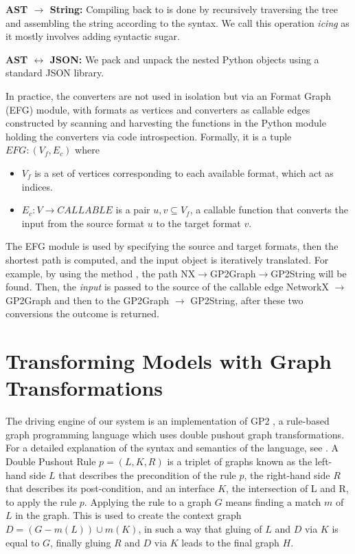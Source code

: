 \documentclass[runningheads]{llncs}
\begin{document}
\noindent\textbf{\essence AST $\rightarrow$ \essence String:} Compiling back to \essence is done by recursively traversing the tree and assembling the string according to the \essence syntax. We call this operation \textit{icing} as it mostly involves adding syntactic sugar.

\noindent\textbf{\essence AST $\leftrightarrow$ JSON:} We pack and unpack the nested Python objects using a standard JSON library.


In practice, the converters are not used in isolation but via an \essence Format Graph (EFG) module, with formats as vertices and converters as callable edges constructed by scanning and harvesting the functions in the Python module holding the converters via code introspection. Formally, it is a tuple $EFG : (V_f, E_c)$ where
\begin{itemize}
    \item $V_f$ is a set of vertices corresponding to each available format, which act as indices.
    \item $E_c : V \rightarrow CALLABLE$ is a pair $u,v \subseteq V_f$, a callable function that converts the input from the source format $u$ to the target format $v$.
\end{itemize}

The EFG module is used by specifying the source and target formats, then the shortest path is computed, and the input object is iteratively translated. For example, by using the method , the path NX$\rightarrow$GP2Graph$\rightarrow$GP2String will be found. Then, the \emph{input} is passed to the source of the callable edge NetworkX $\rightarrow$ GP2Graph and then to the GP2Graph $\rightarrow$ GP2String, after these two conversions the outcome is returned.


\section{Transforming Models with Graph Transformations}

The driving engine of our system is an implementation of GP2 \cite{10.1007/978-3-319-40530-8_7}, a rule-based graph programming language which uses double pushout graph transformations. For a detailed explanation of the syntax and semantics of the language, see \cite{plump2017imperative}.
A Double Pushout Rule $p = (L, K, R)$ is a triplet of graphs known as the left-hand side $L$ that describes the precondition of the rule $p$, the right-hand side $R$ that describes its post-condition, and an interface $K$, the intersection of L and R, to apply the rule $p$. Applying the rule to a graph $G$ means finding a match $m$ of $L$ in the graph. This is used to create the context graph $D=(G-m(L))\cup m(K)$, in such a way that gluing of $L$ and $D$ via $K$ is equal to $G$, finally gluing $R$ and $D$ via $K$ leads to the final graph $H$.
\end{document}
